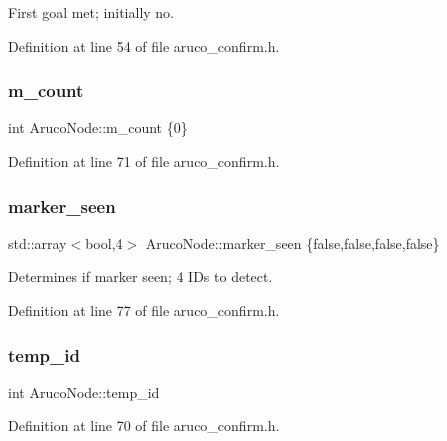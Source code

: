 First goal met; initially no. 



Definition at line 54 of file aruco\+\_\+confirm.\+h.

\mbox{\label{class_aruco_node_a454cdb8d15fa07e7913887a1b2029600}} 
\subsubsection{\texorpdfstring{m\+\_\+count}{m\_count}}
{\footnotesize\ttfamily int Aruco\+Node\+::m\+\_\+count \{0\}}



Definition at line 71 of file aruco\+\_\+confirm.\+h.

\mbox{\label{class_aruco_node_a2e41167c119527f9fbeb937838fc8909}} 
\subsubsection{\texorpdfstring{marker\+\_\+seen}{marker\_seen}}
{\footnotesize\ttfamily std\+::array$<$bool,4$>$ Aruco\+Node\+::marker\+\_\+seen \{false,false,false,false\}}



Determines if marker seen; 4 I\+Ds to detect. 



Definition at line 77 of file aruco\+\_\+confirm.\+h.

\mbox{\label{class_aruco_node_ac9561321e855855ccc8f643cc139a638}} 
\subsubsection{\texorpdfstring{temp\+\_\+id}{temp\_id}}
{\footnotesize\ttfamily int Aruco\+Node\+::temp\+\_\+id}



Definition at line 70 of file aruco\+\_\+confirm.\+h.

\mbox{\label{class_aruco_node_ab410bc0b655071ee67e7ba63b4edf256}} 
